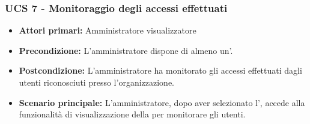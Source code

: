 \subsubsection{UCS 7 - Monitoraggio degli accessi effettuati}


\begin{itemize}
\item \textbf{Attori primari:} Amministratore visualizzatore
\item \textbf{Precondizione:} L'amministratore dispone di almeno un'.
\item \textbf{Postcondizione:} L'amministratore ha monitorato gli accessi effettuati dagli utenti riconosciuti presso l'organizzazione.
\item \textbf{Scenario principale:} L'amministratore, dopo aver selezionato l', accede alla funzionalità di visualizzazione della  per monitorare gli utenti.
\end{itemize}

